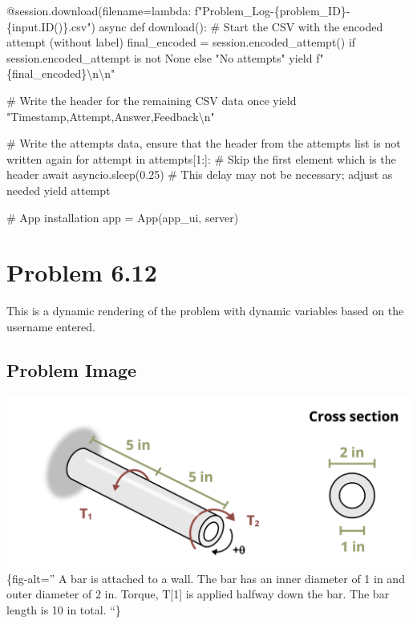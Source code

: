 \documentclass[
  letterpaper,
  DIV=11,
  numbers=noendperiod]{scrreprt}
\newenvironment{Shaded}{\begin{snugshade}}{\end{snugshade}}
\newcommand{\NormalTok}[1]{\textcolor[rgb]{0.00,0.23,0.31}{#1}}
\begin{document}
\begin{Shaded}
\begin{Highlighting}[]
\NormalTok{    @session.download(filename=lambda: f"Problem\_Log{-}\{problem\_ID\}{-}\{input.ID()\}.csv")}
\NormalTok{    async def download():}
\NormalTok{        \# Start the CSV with the encoded attempt (without label)}
\NormalTok{        final\_encoded = session.encoded\_attempt() if session.encoded\_attempt is not None else "No attempts"}
\NormalTok{        yield f"\{final\_encoded\}\textbackslash{}n\textbackslash{}n"}
        
\NormalTok{        \# Write the header for the remaining CSV data once}
\NormalTok{        yield "Timestamp,Attempt,Answer,Feedback\textbackslash{}n"}
        
\NormalTok{        \# Write the attempts data, ensure that the header from the attempts list is not written again}
\NormalTok{        for attempt in attempts[1:]:  \# Skip the first element which is the header}
\NormalTok{            await asyncio.sleep(0.25)  \# This delay may not be necessary; adjust as needed}
\NormalTok{            yield attempt}


\NormalTok{\# App installation}
\NormalTok{app = App(app\_ui, server)}
\end{Highlighting}
\end{Shaded}

\chapter*{Problem 6.12}\label{problem-6.12}


This is a dynamic rendering of the problem with dynamic variables based
on the username entered.

\section*{Problem Image}\label{problem-image-65}


\includegraphics{images/268.png}\{fig-alt='' A bar is attached to a
wall. The bar has an inner diameter of 1 in and outer diameter of 2 in.
Torque, T{[}1{]} is applied halfway down the bar. The bar length is 10
in total. ``\}
\end{document}

